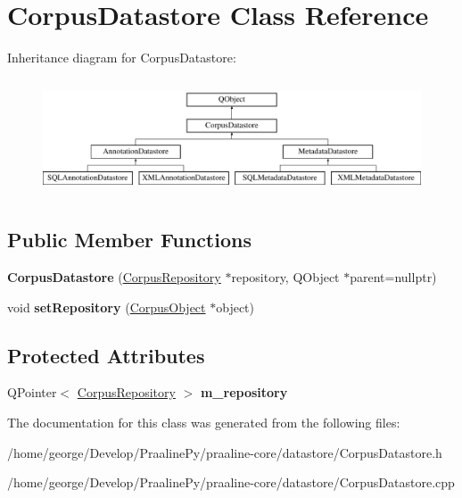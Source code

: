 \hypertarget{class_corpus_datastore}{}\section{Corpus\+Datastore Class Reference}
\label{class_corpus_datastore}
Inheritance diagram for Corpus\+Datastore\+:\begin{figure}[H]
\begin{center}
\leavevmode
\includegraphics[height=3.478261cm]{class_corpus_datastore}
\end{center}
\end{figure}
\subsection*{Public Member Functions}
\begin{DoxyCompactItemize}
\item 
\mbox{\label{class_corpus_datastore_ab203566a38835b0ddea25514316db6bf}} 
{\bfseries Corpus\+Datastore} (\hyperlink{class_corpus_repository}{Corpus\+Repository} $\ast$repository, Q\+Object $\ast$parent=nullptr)
\item 
\mbox{\label{class_corpus_datastore_a6a410cea025fa7fbbd74ab5b6449b4e7}} 
void {\bfseries set\+Repository} (\hyperlink{class_corpus_object}{Corpus\+Object} $\ast$object)
\end{DoxyCompactItemize}
\subsection*{Protected Attributes}
\begin{DoxyCompactItemize}
\item 
\mbox{\label{class_corpus_datastore_a035620fd72f93f9db363d9777b54adf8}} 
Q\+Pointer$<$ \hyperlink{class_corpus_repository}{Corpus\+Repository} $>$ {\bfseries m\+\_\+repository}
\end{DoxyCompactItemize}


The documentation for this class was generated from the following files\+:\begin{DoxyCompactItemize}
\item 
/home/george/\+Develop/\+Praaline\+Py/praaline-\/core/datastore/Corpus\+Datastore.\+h\item 
/home/george/\+Develop/\+Praaline\+Py/praaline-\/core/datastore/Corpus\+Datastore.\+cpp\end{DoxyCompactItemize}
